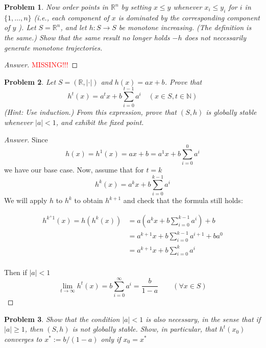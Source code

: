 \documentclass{article}
\newtheorem{problem}{Problem}[section]
\begin{document}
\begin{problem}
    Now order points in $\mathbb{R}^{n}$ by setting $x \leq y$ whenever $x_{i} \leq y_{i}$ for $i$ in $\{1, \ldots, n\}$ (i.e., each component of $x$ is dominated by the corresponding component of $y$ ). Let $S=\mathbb{R}^{n}$, and let $h: S \rightarrow S$ be monotone increasing. (The definition is the same.) Show that the same result no longer holds $-h$ does not necessarily generate monotone trajectories.
\end{problem}

\begin{proof}[Answer]
    \textcolor{red}{MISSING!!!}
\end{proof}

\begin{problem}\label{ex10}
    Let $S=(\mathbb{R},|\cdot|)$ and $h(x)=a x+b$. Prove that
$$
h^{t}(x)=a^{t} x+b \sum_{i=0}^{t-1} a^{i} \quad(x \in S, t \in \mathbb{N})
$$
(Hint: Use induction.) From this expression, prove that $(S, h)$ is globally stable whenever $|a|<1$, and exhibit the fixed point.
\end{problem}

\begin{proof}[Answer]
    Since $$h(x) = h^1(x) = ax + b = a^1 x + b\sum_{i=0}^0a^i $$ we have our base case.
    Now, assume that for $t = k$
    $$
    h^{k}(x)=a^{k} x+b \sum_{i=0}^{k-1} a^{i}
    $$
    We will apply $h$ to $h^k$ to obtain $h^{k+1}$ and check that the formula still holds:
    
    \begin{align*}
        h^{k^+1}(x)=h(h^{k}(x))&= a\left(a^{k} x+b \sum_{i=0}^{k-1} a^{i}\right) + b\\
                                &= a^{k+1}x + b\sum_{i=0}^{k-1} a^{i+1} + b a^0\\
                                &=a^{k+1}x + b\sum_{i=0}^{k} a^{i}\\
    \end{align*}

    Then if $|a|<1$ $$\lim_{t\to \infty} h^t(x) = b \sum_{i=0}^\infty a^i = \frac{b}{1-a}\qquad(\forall x \in S)$$
\end{proof}


\begin{problem}
    Show that the condition $|a|<1$ is also necessary, in the sense that if $|a| \geq 1$, then $(S, h)$ is not globally stable. Show, in particular, that $h^{t}\left(x_{0}\right)$ converges to $x^{*}:=b /(1-a)$ only if $x_{0}=x^{*}$
\end{problem}
\end{document}
